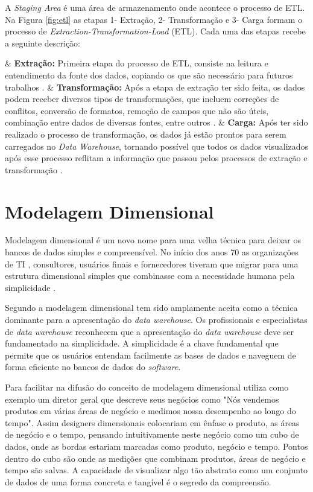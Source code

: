 A \textit{Staging Area} é uma área de armazenamento onde acontece o processo de ETL. Na Figura \ref{fig:etl} as etapas 1- Extração, 2- Transformação e 3- Carga formam o processo de \textit{Extraction-Transformation-Load} (ETL). Cada uma das etapas recebe a seguinte descrição:

\begin{easylist}[itemize]

	& \textbf{Extração: } Primeira etapa do processo de ETL, consiste na leitura e entendimento da fonte 		dos dados, copiando os que são necessário para futuros trabalhos \cite{Kimball2002}.  
	& \textbf{Transformação: } Após a etapa de extração ter sido feita, os dados podem receber diversos tipos de transformações, que incluem correções de conflitos, conversão de formatos, remoção de campos que não são úteis, combinação entre dados de diversas fontes, entre outros \cite{Kimball2002}.
	& \textbf{Carga: } Após ter sido realizado o processo de transformação, os dados já estão prontos para serem carregados no \textit{Data Warehouse}, tornando possível que todos os dados visualizados após esse processo reflitam a informação que passou pelos processos de extração e transformação \cite{neeraj_sharma_2011}.  

	\end{easylist}

\section{Modelagem Dimensional}

Modelagem dimensional é um novo nome para uma velha técnica para deixar os bancos de dados simples e compreensível. No início dos anos 70 as organizações de TI , consultores, usuários finais e fornecedores tiveram que migrar para uma estrutura dimensional simples que combinasse com a necessidade humana pela simplicidade \cite{Kimball2002}. 

Segundo \cite{Kimball2002} a modelagem dimensional tem sido amplamente aceita como a técnica dominante para a apresentação do \textit{data warehouse}. Os profissionais e especialistas de \textit{data warehouse} reconhecem que a apresentação do \textit{data warehouse} deve ser fundamentado na simplicidade. A simplicidade é a chave fundamental que permite que os usuários entendam facilmente as bases de dados e naveguem de forma eficiente no bancos de dados do \textit{software}. 

Para facilitar na difusão do conceito de modelagem dimensional  utiliza como exemplo um diretor geral que descreve seus negócios  como "Nós vendemos produtos em várias áreas de negócio e medimos nossa desempenho ao longo do tempo". Assim designers dimensionais colocariam em ênfase o produto, as áreas de negócio e o tempo, pensando intuitivamente neste negócio como um cubo de dados, onde as bordas estariam marcadas como produto, negócio e tempo. Pontos dentro do cubo são onde as medições que combinam produtos, áreas de negócio e tempo são salvas. A capacidade de visualizar algo tão abstrato como um conjunto de dados de uma forma concreta e tangível é o segredo da compreensão.

